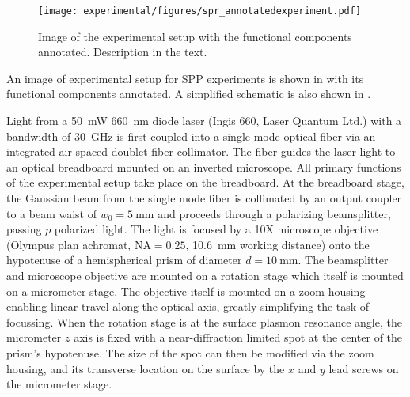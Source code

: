 \begin{figure}[ht]
 \centering
 \texttt{[image: experimental/figures/spr\_annotatedexperiment.pdf]}
 \caption{Image of the experimental setup with the functional
  components annotated.  Description in the text.}
 \label{fig:experimentalpicture}
\end{figure}

An image of experimental setup for SPP experiments is shown in
 with its functional components annotated.
A simplified schematic is also shown in .

Light from a \SI{50}{\milli\watt} \SI{660}{\nano\meter} diode laser (Ingis
660, Laser Quantum Ltd.) with a bandwidth of \SI{30}{\giga\hertz} is first
coupled into a single mode optical fiber via an integrated air-spaced
doublet fiber collimator.  The fiber guides the laser light to an optical
breadboard mounted on an inverted microscope.  All primary functions of the
experimental setup take place on the breadboard.  At the breadboard stage,
the Gaussian beam from the single mode fiber is collimated by an output
coupler to a beam waist of $w_0=\SI{5}{\milli\meter}$ and proceeds through
a polarizing beamsplitter, passing $p$ polarized light.  The light is
focused by a 10X microscope objective (Olympus plan achromat,
$\mathrm{NA}=0.25$, \SI{10.6}{\milli\meter} working distance) onto the
hypotenuse of a hemispherical prism of diameter $d=\SI{10}{\milli\meter}$.
The beamsplitter and microscope objective are mounted on a rotation stage
which itself is mounted on a micrometer stage.  The objective itself is
mounted on a zoom housing enabling linear travel along the optical axis,
greatly simplifying the task of focussing.  When the rotation stage is at
the surface plasmon resonance angle, the micrometer $z$ axis is fixed with
a near-diffraction limited spot at the center of the prism's hypotenuse.
The size of the spot can then be modified via the zoom housing, and its
transverse location on the surface by the $x$ and $y$ lead screws on the
micrometer stage.  

